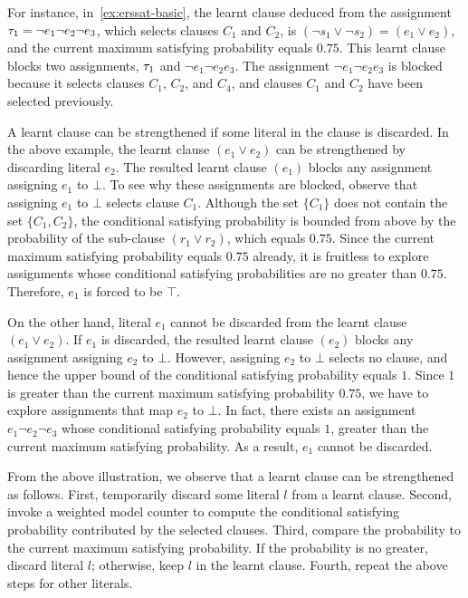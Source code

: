 For instance, in~\cref{ex:erssat-basic},
the learnt clause deduced from the assignment $\tau_1=\lnot e_1 \lnot e_2 \lnot e_3$,
which selects clauses $C_1$ and $C_2$,
is $(\lnot s_1 \lor \lnot s_2)=(e_1 \lor e_2)$,
and the current maximum satisfying probability equals $0.75$.
This learnt clause blocks two assignments, $\tau_1$ and $\lnot e_1 \lnot e_2 e_3$.
The assignment $\lnot e_1 \lnot e_2 e_3$ is blocked
because it selects clauses $C_1$, $C_2$, and $C_4$,
and clauses $C_1$ and $C_2$ have been selected previously.

A learnt clause can be strengthened if some literal in the clause is discarded.
In the above example,
the learnt clause $(e_1 \lor e_2)$ can be strengthened by discarding literal $e_2$.
The resulted learnt clause $(e_1)$ blocks any assignment assigning $e_1$ to $\bot$.
To see why these assignments are blocked,
observe that assigning $e_1$ to $\bot$ selects clause $C_1$.
Although the set $\{C_1\}$ does not contain the set $\{C_1,C_2\}$,
the conditional satisfying probability is bounded from above by the probability of the sub-clause $(r_1 \lor r_2)$,
which equals $0.75$.
Since the current maximum satisfying probability equals $0.75$ already,
it is fruitless to explore assignments whose conditional satisfying probabilities are no greater than $0.75$. Therefore, $e_1$ is forced to be $\top$.

On the other hand,
literal $e_1$ cannot be discarded from the learnt clause $(e_1 \lor e_2)$.
If $e_1$ is discarded,
the resulted learnt clause $(e_2)$ blocks any assignment assigning $e_2$ to $\bot$.
However, assigning $e_2$ to $\bot$ selects no clause,
and hence the upper bound of the conditional satisfying probability equals $1$.
Since $1$ is greater than the current maximum satisfying probability $0.75$,
we have to explore assignments that map $e_2$ to $\bot$.
In fact, there exists an assignment $e_1 \lnot e_2 \lnot e_3$ whose conditional satisfying probability equals $1$,
greater than the current maximum satisfying probability.
As a result, $e_1$ cannot be discarded.

From the above illustration,
we observe that a learnt clause can be strengthened as follows.
First, temporarily discard some literal $l$ from a learnt clause.
Second, invoke a weighted model counter to compute the conditional satisfying probability contributed by the selected clauses.
Third, compare the probability to the current maximum satisfying probability.
If the probability is no greater, discard literal $l$;
otherwise, keep $l$ in the learnt clause.
Fourth, repeat the above steps for other literals.


